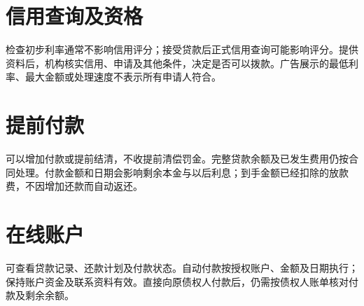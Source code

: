 \documentclass[UTF8,fontset=none,11pt,a4paper]{ctexart}
\begin{document}
\section*{信用查询及资格}
检查初步利率通常不影响信用评分；接受贷款后正式信用查询可能影响评分。提供资料后，机构核实信用、申请及其他条件，决定是否可以拨款。广告展示的最低利率、最大金额或处理速度不表示所有申\allowbreak\mbox{请人符合。}


\section*{提前付款}
可以增加付款或提前结清，不收提前清偿罚金。完整贷款余额及已发生费用仍按合同处理。付款金额和日期会影响剩余本金与以后利息；到手金额已经扣除的放款费，不因增加还款而\allowbreak\mbox{自动返还。}


\section*{在线账户}
可查看贷款记录、还款计划及付款状态。自动付款按授权账户、金额及日期执行；保持账户资金及联系资料有效。直接向原债权人付款后，仍需按债权人账单核对付款及\allowbreak\mbox{剩余余额。}
\end{document}
